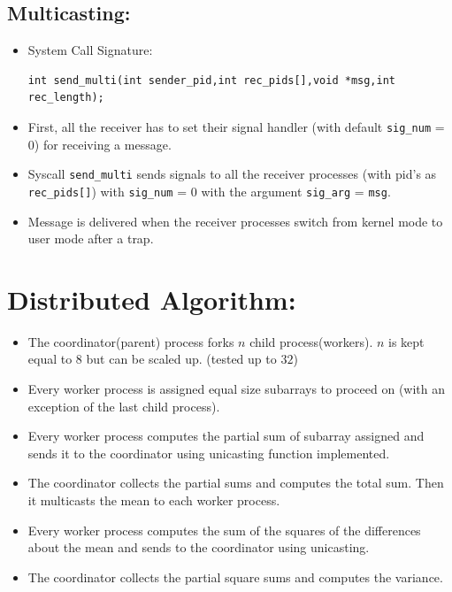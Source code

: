 \documentclass[a4 paper]{article}
\newcommand{\code}[1]{\texttt{#1}}
\begin{document}
\subsection*{Multicasting:}

\begin{itemize}
  \item System Call Signature:
  \begin{lstlisting}
int send_multi(int sender_pid,int rec_pids[],void *msg,int rec_length);
  \end{lstlisting}
  \vspace*{-3mm}
  \item First, all the receiver has to set their signal handler (with default \code{sig\_num} = 0) for receiving a message.
  \item Syscall \code{send\_multi} sends signals to all the receiver processes (with pid's as \code{rec\_pids[]}) with \code{sig\_num} = 0 with the argument \code{sig\_arg} = \code{msg}.
  \item Message is delivered when the receiver processes switch from kernel mode to user mode after a trap.
\end{itemize}


\section{Distributed Algorithm:}

\begin{itemize}
  \item The coordinator(parent) process forks $n$ child process(workers). $n$ is kept equal to 8 but can be scaled up. (tested up to $32$)
  \item Every worker process is assigned equal size subarrays to proceed on (with an exception of the last child process).
  \item Every worker process computes the partial sum of subarray assigned and sends it to the coordinator using unicasting function implemented.
  \item The coordinator collects the partial sums and computes the total sum. Then it multicasts the mean to each worker process.
  \item Every worker process computes the sum of the squares of the differences about the mean and sends to the coordinator using unicasting.
  \item The coordinator collects the partial square sums and computes the variance.
\end{itemize}
  
\end{document}
